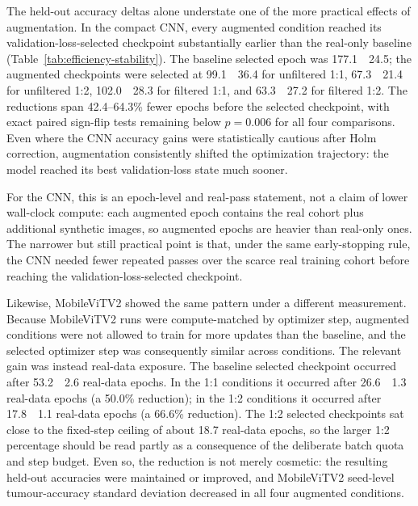 \documentclass[conference,twoside]{IEEEtran}
\begin{document}
The held-out accuracy deltas alone understate one of the more practical effects of augmentation. In the compact CNN, every augmented condition reached its validation-loss-selected checkpoint substantially earlier than the real-only baseline (Table~\ref{tab:efficiency-stability}). The baseline selected epoch was 177.1~\textpm{}~24.5; the augmented checkpoints were selected at 99.1~\textpm{}~36.4 for unfiltered 1:1, 67.3~\textpm{}~21.4 for unfiltered 1:2, 102.0~\textpm{}~28.3 for filtered 1:1, and 63.3~\textpm{}~27.2 for filtered 1:2. The reductions span 42.4--64.3\% fewer epochs before the selected checkpoint, with exact paired sign-flip tests remaining below $p=0.006$ for all four comparisons. Even where the CNN accuracy gains were statistically cautious after Holm correction, augmentation consistently shifted the optimization trajectory: the model reached its best validation-loss state much sooner.

For the CNN, this is an epoch-level and real-pass statement, not a claim of lower wall-clock compute: each augmented epoch contains the real cohort plus additional synthetic images, so augmented epochs are heavier than real-only ones. The narrower but still practical point is that, under the same early-stopping rule, the CNN needed fewer repeated passes over the scarce real training cohort before reaching the validation-loss-selected checkpoint.

Likewise, MobileViTV2 showed the same pattern under a different measurement. Because MobileViTV2 runs were compute-matched by optimizer step, augmented conditions were not allowed to train for more updates than the baseline, and the selected optimizer step was consequently similar across conditions. The relevant gain was instead real-data exposure. The baseline selected checkpoint occurred after 53.2~\textpm{}~2.6 real-data epochs. In the 1:1 conditions it occurred after 26.6~\textpm{}~1.3 real-data epochs (a 50.0\% reduction); in the 1:2 conditions it occurred after 17.8~\textpm{}~1.1 real-data epochs (a 66.6\% reduction). The 1:2 selected checkpoints sat close to the fixed-step ceiling of about 18.7 real-data epochs, so the larger 1:2 percentage should be read partly as a consequence of the deliberate batch quota and step budget. Even so, the reduction is not merely cosmetic: the resulting held-out accuracies were maintained or improved, and MobileViTV2 seed-level tumour-accuracy standard deviation decreased in all four augmented conditions.
\end{document}
